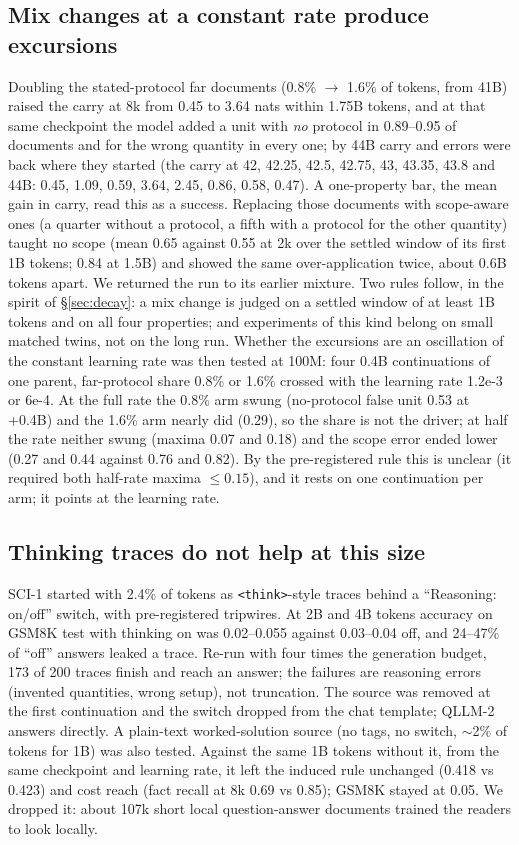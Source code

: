 \documentclass[11pt]{article}
\newcommand{\model}{QLLM-2}
\newcommand{\scione}{SCI-1}
\begin{document}
\subsection{Mix changes at a constant rate produce excursions}
\label{sec:excursion}
Doubling the stated-protocol far documents (0.8\% $\to$ 1.6\% of tokens, from 41B) raised the carry at 8k from 0.45 to 3.64 nats within 1.75B tokens, and at that same checkpoint the model added a unit with \emph{no} protocol in 0.89--0.95 of documents and for the wrong quantity in every one; by 44B carry and errors were back where they started (the carry at 42, 42.25, 42.5, 42.75, 43, 43.35, 43.8 and 44B: 0.45, 1.09, 0.59, 3.64, 2.45, 0.86, 0.58, 0.47). A one-property bar, the mean gain in carry, read this as a success. Replacing those documents with scope-aware ones (a quarter without a protocol, a fifth with a protocol for the other quantity) taught no scope (mean 0.65 against 0.55 at 2k over the settled window of its first 1B tokens; 0.84 at 1.5B) and showed the same over-application twice, about 0.6B tokens apart. We returned the run to its earlier mixture. Two rules follow, in the spirit of \S\ref{sec:decay}: a mix change is judged on a settled window of at least 1B tokens and on all four properties; and experiments of this kind belong on small matched twins, not on the long run. Whether the excursions are an oscillation of the constant learning rate was then tested at 100M: four 0.4B continuations of one parent, far-protocol share 0.8\% or 1.6\% crossed with the learning rate 1.2e-3 or 6e-4. At the full rate the 0.8\% arm swung (no-protocol false unit 0.53 at +0.4B) and the 1.6\% arm nearly did (0.29), so the share is not the driver; at half the rate neither swung (maxima 0.07 and 0.18) and the scope error ended lower (0.27 and 0.44 against 0.76 and 0.82). By the pre-registered rule this is unclear (it required both half-rate maxima $\le 0.15$), and it rests on one continuation per arm; it points at the learning rate.

\subsection{Thinking traces do not help at this size}
\label{sec:think}
\scione{} started with 2.4\% of tokens as \texttt{<think>}-style traces behind a ``Reasoning: on/off'' switch, with pre-registered tripwires. At 2B and 4B tokens accuracy on GSM8K test with thinking on was 0.02--0.055 against 0.03--0.04 off, and 24--47\% of ``off'' answers leaked a trace. Re-run with four times the generation budget, 173 of 200 traces finish and reach an answer; the failures are reasoning errors (invented quantities, wrong setup), not truncation. The source was removed at the first continuation and the switch dropped from the chat template; \model{} answers directly. A plain-text worked-solution source (no tags, no switch, $\sim$2\% of tokens for 1B) was also tested. Against the same 1B tokens without it, from the same checkpoint and learning rate, it left the induced rule unchanged (0.418 vs 0.423) and cost reach (fact recall at 8k 0.69 vs 0.85); GSM8K stayed at 0.05. We dropped it: about 107k short local question-answer documents trained the readers to look locally.
\end{document}
